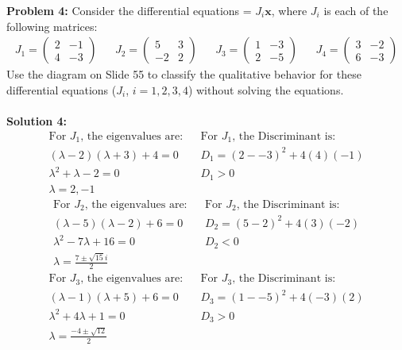\documentclass[12pt]{article}
\begin{document}
\noindent \textbf{Problem 4: }Consider the differential equations  = $J_i\textbf{x}$, where $J_i$ is each of the following matrices: 
\begin{align*}
	J_1 = \begin{pmatrix}
		2 & -1 \\
		4 & -3
	\end{pmatrix} &&
	J_2 = \begin{pmatrix}
		5 & 3 \\
		-2 & 2
	\end{pmatrix} &&
	J_3 = \begin{pmatrix}
		1 & -3 \\
		2 & -5
	\end{pmatrix} &&
	J_4 = \begin{pmatrix}
		3 & -2 \\
		6 & -3
	\end{pmatrix}
\end{align*}
Use the diagram on Slide 55 to classify the qualitative behavior for these differential equations
($J_i$, $i = 1, 2, 3, 4$) without solving the equations.
\\ \\
\noindent \textbf{Solution 4: } \\ 
	\begin{align*}
		\text{For $J_1$, the eigenvalues are:} && \text{For $J_1$, the Discriminant is:}  \\
		(\lambda - 2)(\lambda + 3) + 4 = 0 && D_1 = (2 - -3)^2 + 4(4)(-1) \\
		\lambda^2 + \lambda - 2 = 0 && D_1 > 0  \\
		\lambda = 2, -1 && 
	\end{align*}
	\begin{align*}
		 \text{For $J_2$, the eigenvalues are:}  &&  \text{For $J_2$, the Discriminant is:}  \\
		(\lambda - 5)(\lambda - 2) + 6 = 0  &&  D_2 = (5 - 2)^2 + 4(3)(-2)   \\
		\lambda^2 - 7\lambda + 16 = 0 && D_2 < 0   \\
		\lambda = \frac{7 \pm \sqrt{15}i}{2} && 
	\end{align*}
	\begin{align*}
		\text{For $J_3$, the eigenvalues are:} &&  \text{For $J_3$, the Discriminant is:} \\
		(\lambda - 1)(\lambda + 5) + 6 = 0 && D_3 = (1 - -5)^2 + 4(-3)(2) \\
		\lambda^2 + 4\lambda + 1 = 0 &&	  	D_3 > 0  \\
		 \lambda = \frac{-4 \pm \sqrt{12}}{2} &&  
	\end{align*} 
\end{document}
